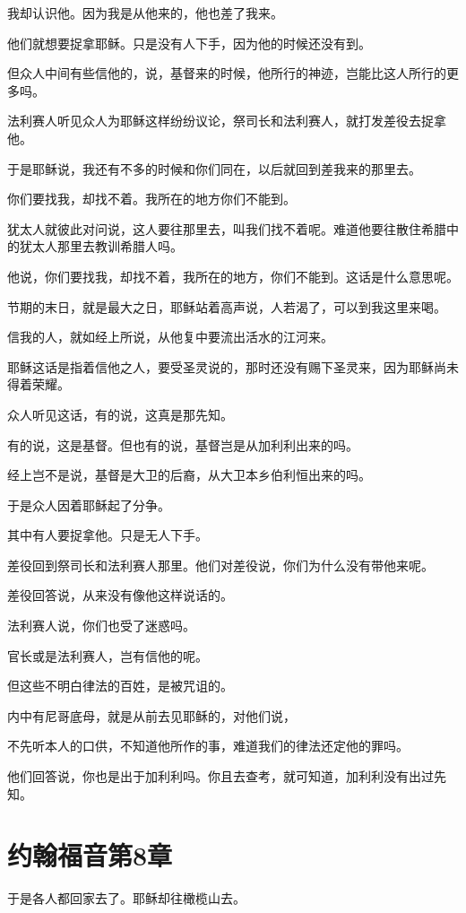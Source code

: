 \documentclass[12pt,oneside]{book}
\begin{document}
我却认识他。因为我是从他来的，他也差了我来。

他们就想要捉拿耶稣。只是没有人下手，因为他的时候还没有到。

但众人中间有些信他的，说，基督来的时候，他所行的神迹，岂能比这人所行的更多吗。

法利赛人听见众人为耶稣这样纷纷议论，祭司长和法利赛人，就打发差役去捉拿他。

于是耶稣说，我还有不多的时候和你们同在，以后就回到差我来的那里去。

你们要找我，却找不着。我所在的地方你们不能到。

犹太人就彼此对问说，这人要往那里去，叫我们找不着呢。难道他要往散住希腊中的犹太人那里去教训希腊人吗。

他说，你们要找我，却找不着，我所在的地方，你们不能到。这话是什么意思呢。

节期的末日，就是最大之日，耶稣站着高声说，人若渴了，可以到我这里来喝。

信我的人，就如经上所说，从他复中要流出活水的江河来。

耶稣这话是指着信他之人，要受圣灵说的，那时还没有赐下圣灵来，因为耶稣尚未得着荣耀。

众人听见这话，有的说，这真是那先知。

有的说，这是基督。但也有的说，基督岂是从加利利出来的吗。

经上岂不是说，基督是大卫的后裔，从大卫本乡伯利恒出来的吗。

于是众人因着耶稣起了分争。

其中有人要捉拿他。只是无人下手。

差役回到祭司长和法利赛人那里。他们对差役说，你们为什么没有带他来呢。

差役回答说，从来没有像他这样说话的。

法利赛人说，你们也受了迷惑吗。

官长或是法利赛人，岂有信他的呢。

但这些不明白律法的百姓，是被咒诅的。

内中有尼哥底母，就是从前去见耶稣的，对他们说，

不先听本人的口供，不知道他所作的事，难道我们的律法还定他的罪吗。

他们回答说，你也是出于加利利吗。你且去查考，就可知道，加利利没有出过先知。

\chapter{约翰福音第8章}
于是各人都回家去了。耶稣却往橄榄山去。
\end{document}
